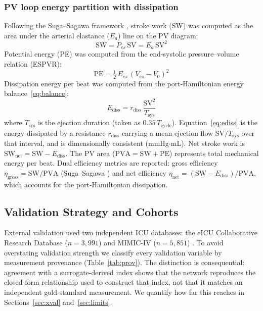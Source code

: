 \documentclass[journal]{IEEEtran}
\begin{document}
\subsubsection{PV loop energy partition with dissipation}\label{sec:pv}
Following the Suga--Sagawa framework \cite{suga1974}, stroke work (SW) was computed as the area under the arterial elastance ($E_a$) line on the PV diagram:
\begin{equation}\label{eq:sw}
\text{SW} = P_{es}\,\text{SV} = E_a\,\text{SV}^2
\end{equation}
Potential energy (PE) was computed from the end-systolic pressure--volume relation (ESPVR):
\begin{equation}\label{eq:pe}
\text{PE} = \tfrac{1}{2}\, E_{es}\,(V_{es} - V_0)^2
\end{equation}
Dissipation energy per beat was computed from the port-Hamiltonian energy balance~\eqref{eq:balance}:
\begin{equation}\label{eq:ediss}
E_{\text{diss}} = r_{\text{diss}}\,\frac{\text{SV}^{2}}{T_{\text{sys}}}
\end{equation}
where $T_{\text{sys}}$ is the ejection duration (taken as $0.35\,T_{\text{cycle}}$). Equation~\eqref{eq:ediss} is the energy dissipated by a resistance $r_{\text{diss}}$ carrying a mean ejection flow $\text{SV}/T_{\text{sys}}$ over that interval, and is dimensionally consistent (mmHg$\cdot$mL). Net stroke work is $\text{SW}_{\text{net}}=\text{SW}-E_{\text{diss}}$. The PV area ($\text{PVA}=\text{SW}+\text{PE}$) represents total mechanical energy per beat. Dual efficiency metrics are reported: gross efficiency $\eta_{\text{gross}}=\text{SW}/\text{PVA}$ (Suga--Sagawa \cite{suga1974}) and net efficiency $\eta_{\text{net}}=(\text{SW}-E_{\text{diss}})/\text{PVA}$, which accounts for the port-Hamiltonian dissipation.

\subsection{Validation Strategy and Cohorts}\label{sec:val}
External validation used two independent ICU databases: the eICU Collaborative Research Database ($n=3{,}991$) and MIMIC-IV ($n=5{,}851$) \cite{johnson2023,johnson2016,pollard2018}. To avoid overstating validation strength we classify every validation variable by measurement provenance (Table~\ref{tab:prov}). The distinction is consequential: agreement with a surrogate-derived index shows that the network reproduces the closed-form relationship used to construct that index, not that it matches an independent gold-standard measurement. We quantify how far this reaches in Sections~\ref{sec:xval} and~\ref{sec:limits}.
\end{document}
